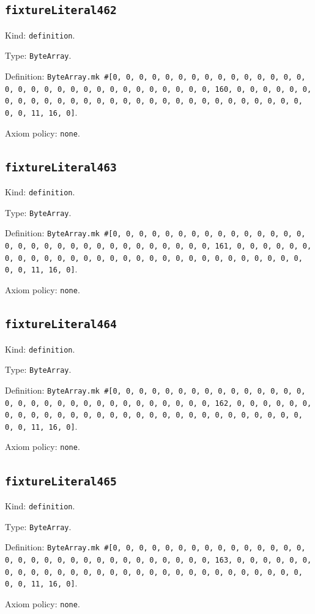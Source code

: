 \documentclass[11pt]{article}
\begin{document}
\subsection*{\texttt{fixtureLiteral462}}
\noindent Kind: \texttt{definition}.\par
\noindent Type: \texttt{ByteArray}.\par
\noindent Definition: \texttt{ByteArray.mk \#[0, 0, 0, 0, 0, 0, 0, 0, 0, 0, 0, 0, 0, 0, 0, 0, 0, 0, 0, 0, 0, 0, 0, 0, 0, 0, 0, 0, 0, 0, 0, 160, 0, 0, 0, 0, 0, 0, 0, 0, 0, 0, 0, 0, 0, 0, 0, 0, 0, 0, 0, 0, 0, 0, 0, 0, 0, 0, 0, 0, 0, 0, 0, 11, 16, 0]}.\par
\noindent Axiom policy: \texttt{none}.\par
\subsection*{\texttt{fixtureLiteral463}}
\noindent Kind: \texttt{definition}.\par
\noindent Type: \texttt{ByteArray}.\par
\noindent Definition: \texttt{ByteArray.mk \#[0, 0, 0, 0, 0, 0, 0, 0, 0, 0, 0, 0, 0, 0, 0, 0, 0, 0, 0, 0, 0, 0, 0, 0, 0, 0, 0, 0, 0, 0, 0, 161, 0, 0, 0, 0, 0, 0, 0, 0, 0, 0, 0, 0, 0, 0, 0, 0, 0, 0, 0, 0, 0, 0, 0, 0, 0, 0, 0, 0, 0, 0, 0, 11, 16, 0]}.\par
\noindent Axiom policy: \texttt{none}.\par
\subsection*{\texttt{fixtureLiteral464}}
\noindent Kind: \texttt{definition}.\par
\noindent Type: \texttt{ByteArray}.\par
\noindent Definition: \texttt{ByteArray.mk \#[0, 0, 0, 0, 0, 0, 0, 0, 0, 0, 0, 0, 0, 0, 0, 0, 0, 0, 0, 0, 0, 0, 0, 0, 0, 0, 0, 0, 0, 0, 0, 162, 0, 0, 0, 0, 0, 0, 0, 0, 0, 0, 0, 0, 0, 0, 0, 0, 0, 0, 0, 0, 0, 0, 0, 0, 0, 0, 0, 0, 0, 0, 0, 11, 16, 0]}.\par
\noindent Axiom policy: \texttt{none}.\par
\subsection*{\texttt{fixtureLiteral465}}
\noindent Kind: \texttt{definition}.\par
\noindent Type: \texttt{ByteArray}.\par
\noindent Definition: \texttt{ByteArray.mk \#[0, 0, 0, 0, 0, 0, 0, 0, 0, 0, 0, 0, 0, 0, 0, 0, 0, 0, 0, 0, 0, 0, 0, 0, 0, 0, 0, 0, 0, 0, 0, 163, 0, 0, 0, 0, 0, 0, 0, 0, 0, 0, 0, 0, 0, 0, 0, 0, 0, 0, 0, 0, 0, 0, 0, 0, 0, 0, 0, 0, 0, 0, 0, 11, 16, 0]}.\par
\noindent Axiom policy: \texttt{none}.\par
\end{document}
